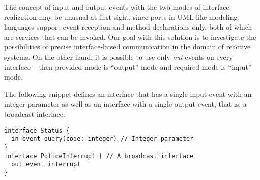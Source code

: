 The concept of input and output events with the two modes of interface realization may be unusual at first sight, since ports in UML-like modeling languages support event reception and method declarations only, both of which are services that can be invoked. Our goal with this solution is to investigate the possibilities of precise interface-based communication in the domain of reactive systems. On the other hand, it is possible to use only \emph{out} events on every interface -- then provided mode is ``output'' mode and required
mode is ``input'' mode.

The following snippet defines an interface that has a single input event with an integer parameter as well as an interface with a single output event, that is, a broadcast interface. 
\begin{lstlisting}
interface Status {
  in event query(code: integer) // Integer parameter
}
interface PoliceInterrupt { // A broadcast interface
  out event interrupt
}
\end{lstlisting}

%

